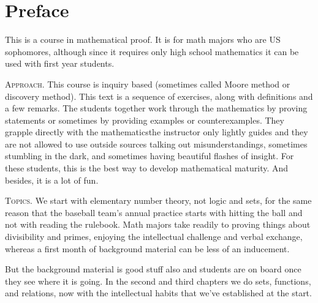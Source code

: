 \chapter*{Preface}

This is a course in mathematical proof. 
It is for math majors who are US sophomores, although since
it requires only high school mathematics
it can be used with first year students.



\medskip
\noindent\textsc{Approach.}
This course is inquiry based (sometimes called Moore method 
or discovery method).
This text is a sequence of exercises,
along with definitions and a few 
remarks.
The students together work through the mathematics by
proving statements or sometimes by providing examples or counterexamples.
They grapple directly with the mathematics\Dash the instructor only 
lightly guides and they are not allowed to use outside sources\Dash
talking out misunderstandings, 
sometimes stumbling in the dark, and sometimes
having beautiful flashes of insight.
For these students, 
this is the best way to develop mathematical maturity.
And besides, it is a lot of fun.


\medskip
\noindent\textsc{Topics.}
We start with elementary number theory, not logic and sets, 
for the same reason
that the baseball team's annual practice starts with hitting the ball and 
not with reading the rulebook.
Math majors take readily to proving things about
divisibility and primes, enjoying the 
intellectual challenge and verbal exchange, 
whereas a first month of background material can be less of an inducement.

But the background material is good stuff also and 
students are on board once they see where it is going.
In the second and third chapters we do
sets, functions, and relations, now with the
intellectual habits that we've established at the start.





